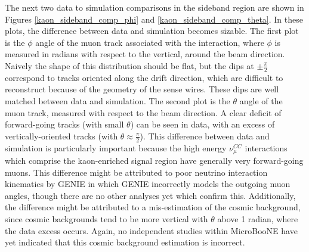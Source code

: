 The next two data to simulation comparisons in the sideband region are shown in Figures \ref{kaon_sideband_comp_phi} and \ref{kaon_sideband_comp_theta}. In these plots, the difference between data and simulation becomes sizable. The first plot is the $\phi$ angle of the muon track associated with the interaction, where $\phi$ is measured in radians with respect to the vertical, around the beam direction. Naively the shape of this distribution should be flat, but the dips at $\pm\frac{\pi}{2}$ correspond to tracks oriented along the drift direction, which are difficult to reconstruct because of the geometry of the sense wires. These dips are well matched between data and simulation. The second plot is the $\theta$ angle of the muon track, measured with respect to the beam direction. A clear deficit of forward-going tracks (with small $\theta$) can be seen in data, with an excess of vertically-oriented tracks (with $\theta\approx\frac{\pi}{2}$). This difference between data and simulation is particularly important because the high energy $\nu_\mu^{CC}$ interactions which comprise the kaon-enriched signal region have generally very forward-going muons. This difference might be attributed to poor neutrino interaction kinematics by GENIE in which GENIE incorrectly models the outgoing muon angles, though there are no other analyses yet which confirm this. Additionally, the difference might be attributed to a mis-estimation of the cosmic background, since cosmic backgrounds tend to be more vertical with $\theta$ above 1 radian, where the data excess occurs. Again, no independent studies within MicroBooNE have yet indicated that this cosmic background estimation is incorrect.\\

